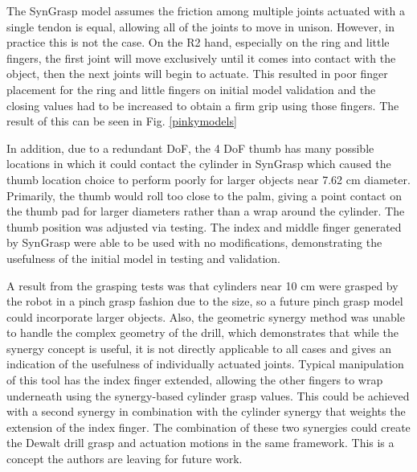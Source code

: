 \documentclass[runningheads,a4paper]{llncs}
\begin{document}
The SynGrasp model assumes the friction among multiple joints actuated with a single tendon is equal, allowing all of the joints to move in unison. However, in practice this is not the case. On the R2 hand, especially on the ring and little fingers, the first joint will move exclusively until it comes into contact with the object, then the next joints will begin to actuate. This resulted in poor finger placement for the ring and little fingers on initial model validation and the closing values had to be increased to obtain a firm grip using those fingers. The result of this can be seen in Fig. \ref{pinkymodels}

In addition, due to a redundant DoF, the 4 DoF thumb has many possible locations in which it could contact the cylinder in SynGrasp which caused the thumb location choice to perform poorly for larger objects near 7.62 cm diameter. Primarily, the thumb would roll too close to the palm, giving a point contact on the thumb pad for larger diameters rather than a wrap around the cylinder. The thumb position was adjusted via testing. The index and middle finger generated by SynGrasp were able to be used with no modifications, demonstrating the usefulness of the initial model in testing and validation. 

A result from the grasping tests was that cylinders near 10 cm were grasped by the robot in a pinch grasp fashion due to the size, so a future pinch grasp model could incorporate larger objects. Also, the geometric synergy method was unable to handle the complex geometry of the drill, which demonstrates that while the synergy concept is useful, it is not directly applicable to all cases and gives an indication of the usefulness of individually actuated joints. Typical manipulation of this tool has the index finger extended, allowing the other fingers to wrap underneath using the synergy-based cylinder grasp values. This could be achieved with a second synergy in combination with the cylinder synergy that weights the extension of the index finger. The combination of these two synergies could create the Dewalt drill grasp and actuation motions in the same framework. This is a concept the authors are leaving for future work. 
\end{document}
